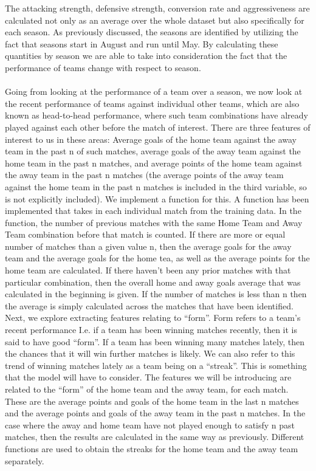 \documentclass[a4paper,12pt]{article}
\begin{document}
	The attacking strength, defensive strength, conversion rate and aggressiveness are calculated not only as an average over the whole dataset but also specifically for each season. As previously discussed, the seasons are identified by utilizing the fact that seasons start in August and run until May. By calculating these quantities by season we are able to take into consideration the fact that the performance of teams change with respect to season. \\
	\\
	Going from looking at the performance of a team over a season, we now look at the recent performance of teams against individual other teams, which are also known as head-to-head performance, where such team combinations have already played against each other before the match of interest. There are three features of interest to us in these areas: Average goals of the home team against the away team in the past n of such matches, average goals of the away team against the home team in the past n matches, and average points of the home team against the away team in the past n matches (the average points of the away team against the home team in the past n matches is included in the third variable, so is not explicitly included). We implement a function for this. A function has been implemented that takes in each individual match from the training data. In the function, the number of previous matches with the same Home Team and Away Team combination before that match is counted. If there are more or equal number of matches than a given value n, then the average goals for the away team and the average goals for the home tea, as well as the average points for the home team are calculated. If there haven’t been any prior matches with that particular combination, then the overall home and away goals average that was calculated in the beginning is given.  If the number of matches is less than n then the average is simply calculated across the matches that have been identified.
	Next, we explore extracting features relating to “form”. Form refers to a team’s recent performance I.e. if a team has been winning matches recently, then it is said to have good “form”. If a team has been winning many matches lately, then the chances that it will win further matches is likely. We can also refer to this trend of winning matches lately as a team being on a “streak”. This is something that the model will have to consider. The features we will be introducing are related to the “form” of the home team and the away team, for each match. These are the average points and goals of the home team in the last n matches and the average points and goals of the away team in the past n matches. In the case where the away and home team have not played enough to satisfy n past matches, then the results are calculated in the same way as previously. Different functions are used to obtain the streaks for the home team and the away team separately.\\
\end{document}
